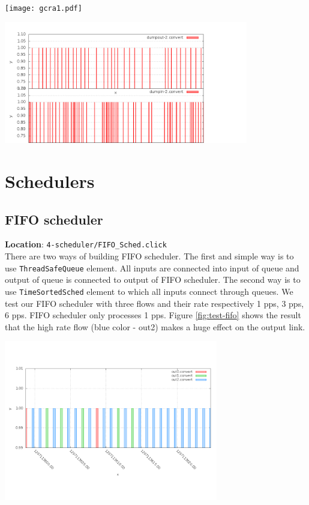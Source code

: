 \documentclass[a4paper]{article}
\begin{document}
  \begin{center}
	\texttt{[image: gcra1.pdf]}
	\label{fig:gcra}
  \end{center}
  
  \begin{center}
	\includegraphics[width=0.80\textwidth]{test-gcra.png}
	\label{fig:test-gcra}
  \end{center}
  
  \section{Schedulers}
  \subsection{FIFO scheduler}
  \textbf{Location}: \texttt{4-scheduler/FIFO\_Sched.click}\\
  There are two ways of building FIFO scheduler. The first and simple way is to use \texttt{ThreadSafeQueue} element. All inputs are connected into input of queue and output of queue is connected to output of FIFO scheduler. The second way is to use \texttt{TimeSortedSched} element to which all inputs connect through queues. We test our FIFO scheduler with three flows and their rate respectively 1 pps, 3 pps, 6 pps. FIFO scheduler only processes 1 pps. Figure \ref{fig:test-fifo} shows the result that the high rate flow (blue color - out2) makes a huge effect on the output link.
  \begin{center}
	\includegraphics[height=0.3\textheight, width=0.70\textwidth]{fifo-dense.png}
	\label{fig:test-fifo}
  \end{center}
  
\end{document}
